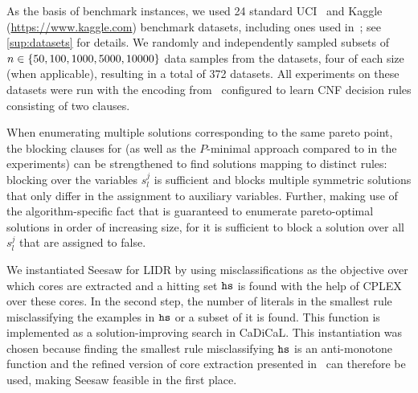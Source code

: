 As the basis of benchmark instances, we used 24 standard UCI~\autocite{UciMlr} and Kaggle ({\small\url{https://www.kaggle.com}}) benchmark datasets, including ones used in~\textcite{DBLP:conf/cp/MaliotovM18}; see \cref{sup:datasets} for details.
We randomly and independently sampled subsets of $n\in\{50,100,1000,5000,10000\}$ data samples from the datasets, four of each size (when applicable), resulting in a total of 372 datasets. %
All experiments on these datasets were run with the encoding from~\textcite{DBLP:conf/cp/MaliotovM18} configured to learn CNF decision rules consisting of two clauses.

When enumerating multiple solutions corresponding to the same pareto point, the blocking clauses for \algname{} (as well as the $P$-minimal approach compared to in the experiments) can be strengthened to find solutions mapping to distinct rules:
blocking over the variables $s_l^j$ is sufficient and blocks multiple symmetric solutions that only differ in the assignment to auxiliary variables.
Further, making use of the algorithm-specific fact that \algname{} is guaranteed to enumerate pareto-optimal solutions in order of increasing size, for \algname{} it is sufficient to block a solution over all $s_l^j$ that are assigned to false.

We instantiated Seesaw for LIDR by using misclassifications as the objective over which cores are extracted and a hitting set $\texttt{hs}$ is found with the help of CPLEX over these cores.
In the second step, the number of literals in the smallest rule misclassifying the examples in $\texttt{hs}$ or a subset of it is found.
This function is implemented as a solution-improving search in CaDiCaL.
This instantiation was chosen because finding the smallest rule misclassifying $\texttt{hs}$ is an anti-monotone function and the refined version of core extraction presented in~\textcite{DBLP:conf/cp/JanotaMSM21} can therefore be used, making Seesaw feasible in the first place.

